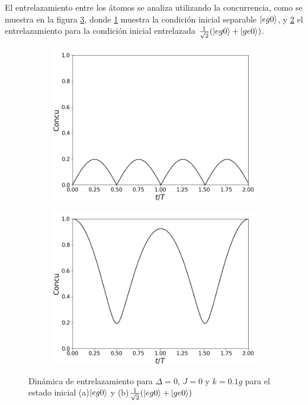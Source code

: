 El entrelazamiento entre los átomos se analiza utilizando la concurrencia, como se muestra en la figura \ref{fig4:concu k}, donde \ref{fig4:concu k eg0} muestra la condición inicial separable $\ket{eg0}$, y \ref{fig4:concu k eg0 sim} el entrelazamiento para la condición inicial entrelazada $\frac{1}{\sqrt{2}}(\ket{eg0}+\ket{ge0})$. 
\begin{figure}[h]
    \centering
    \begin{subfigure}{0.49\textwidth}
        \includegraphics[width=\textwidth]{figuras/ch4/k eg0 concu.png}
        \caption{}
        \label{fig4:concu k eg0}
    \end{subfigure}
    \hfill
    \begin{subfigure}{0.49\textwidth}
        \includegraphics[width=\textwidth]{figuras/ch4/k eg0+ concu.png}
        \caption{}
        \label{fig4:concu k eg0 sim}
    \end{subfigure}
    \caption{Dinámica de entrelazamiento para $\Delta=0$, $J=0$ y $k=0.1g$ para el estado inicial (a)$\ket{eg0}$ y (b)$\frac{1}{\sqrt{2}}(\ket{eg0}+\ket{ge0})$}
    \label{fig4:concu k}
\end{figure}

